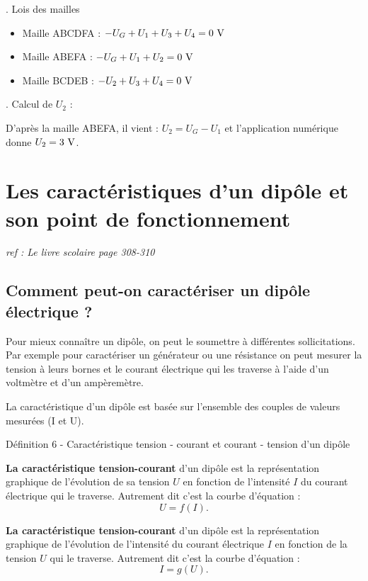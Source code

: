 \documentclass[french, a4paper, 12pt]{article}
\begin{document}
{\begin{minipage}{.45\textwidth}
\begin{circuitikz}[
	line width = 0.8pt,
	voltage shift = 0.5]
	\end{circuitikz}
\end{minipage}
\begin{minipage}{.5\textwidth}
	. Lois des mailles
	\begin{itemize}
		\item Maille ABCDFA : $-U_G+U_1+U_3+U_4 = 0~\rm V$
		\item Maille ABEFA  : $-U_G+U_1+U_2 = 0~\rm V$
		\item Maille BCDEB  : $-U_2+U_3+U_4 = 0~\rm V$
	\end{itemize}
	. Calcul de $U_2$ : 

	D'après la maille ABEFA, il vient : $U_2=U_G-U_1$ et l'application numérique donne $U_2 = 3~\rm V$.

	
\end{minipage}

}

\clearpage

\section{Les caractéristiques d'un dipôle et son point de fonctionnement}
\begin{center}
	\textit{ref : Le livre scolaire page 308-310}
\end{center}
\subsection{Comment peut-on caractériser un dipôle électrique ?}

Pour mieux connaître un dipôle, on peut le soumettre à différentes sollicitations. Par exemple pour caractériser un générateur ou une résistance on peut mesurer la tension à leurs bornes et le courant électrique qui les traverse à l'aide d'un voltmètre et d'un ampèremètre.

La caractéristique d'un dipôle est basée sur l'ensemble des couples de valeurs mesurées (I et U).

\begin{definition}{Définition 6 - Caractéristique tension - courant et courant - tension d'un dipôle}
	
	\textbf{La caractéristique tension-courant} d'un dipôle est la représentation graphique de l'évolution de sa tension $U$ en fonction de l'intensité $I$ du courant électrique qui le traverse. Autrement dit c'est la courbe d'équation : 
	\begin{equation}
		U = f(I).
	\end{equation}

	\textbf{La caractéristique tension-courant} d'un dipôle est la représentation graphique de l'évolution de l'intensité du courant électrique $I$ en fonction de la tension $U$ qui le traverse. Autrement dit c'est la courbe d'équation : 
	\begin{equation}
		I = g(U).
	\end{equation}
\end{definition}
\end{document}
